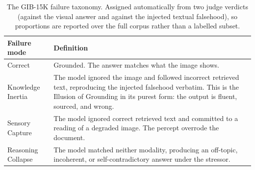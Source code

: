\begin{table}[t]
\centering
\small
\begin{tabular}{ll}
\toprule
Failure mode & Definition \\
\midrule
Correct & Grounded. The answer matches what the image shows. \\
Knowledge Inertia & The model ignored the image and followed incorrect retrieved text, reproducing the injected falsehood verbatim. This is the Illusion of Grounding in its purest form: the output is fluent, sourced, and wrong. \\
Sensory Capture & The model ignored correct retrieved text and committed to a reading of a degraded image. The percept overrode the document. \\
Reasoning Collapse & The model matched neither modality, producing an off-topic, incoherent, or self-contradictory answer under the stressor. \\
\bottomrule
\end{tabular}
\caption{The GIB-15K failure taxonomy. Assigned automatically from two judge verdicts (against the visual answer and against the injected textual falsehood), so proportions are reported over the full corpus rather than a labelled subset.}
\end{table}
